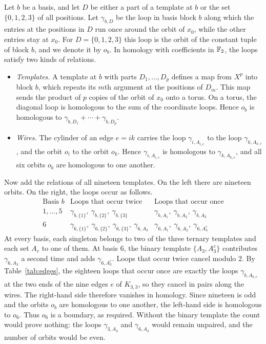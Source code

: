 Let $b$ be a basis, and let $D$ be either a part of a template at $b$ or the set $\{0,1,2,3\}$ of all positions. Let $\gamma_{b,D}$ be the loop in basis block $b$ along which the entries at the positions in $D$ run once around the orbit of $x_0$, while the other entries stay at $x_0$. For $D=\{0,1,2,3\}$ this loop is the orbit of the constant tuple of block $b$, and we denote it by $o_b$. In homology with coefficients in $\mathbb F_2$, the loops satisfy two kinds of relations.
\begin{itemize}
\item \emph{Templates.} A template at $b$ with parts $D_1,\ldots,D_p$ defines a map from $X^p$ into block $b$, which repeats its $m$th argument at the positions of $D_m$. This map sends the product of $p$ copies of the orbit of $x_0$ onto a torus. On a torus, the diagonal loop is homologous to the sum of the coordinate loops. Hence $o_b$ is homologous to $\gamma_{b,D_1}+\cdots+\gamma_{b,D_p}$.
\item \emph{Wires.} The cylinder of an edge $e=ik$ carries the loop $\gamma_{i,A_{i,e}}$ to the loop $\gamma_{k,A_{k,e}}$, and the orbit $o_i$ to the orbit $o_k$. Hence $\gamma_{i,A_{i,e}}$ is homologous to $\gamma_{k,A_{k,e}}$, and all six orbits $o_b$ are homologous to one another.
\end{itemize}
Now add the relations of all nineteen templates. On the left there are nineteen orbits. On the right, the loops occur as follows.
\[
\begin{array}{c|c|c}
\text{Basis }b & \text{Loops that occur twice} & \text{Loops that occur once}\\ \hline
1,\ldots,5 & \gamma_{b,\{1\}},\ \gamma_{b,\{2\}},\ \gamma_{b,\{3\}} & \gamma_{b,A_1},\ \gamma_{b,A_2},\ \gamma_{b,A_3}\\
6 & \gamma_{6,\{1\}},\ \gamma_{6,\{2\}},\ \gamma_{6,\{3\}},\ \gamma_{6,A_3} & \gamma_{6,A_1},\ \gamma_{6,A_2},\ \gamma_{6,A_3^c}
\end{array}
\]
At every basis, each singleton belongs to two of the three ternary templates and each set $A_r$ to one of them. At basis $6$, the binary template $\{A_3,A_3^c\}$ contributes $\gamma_{6,A_3}$ a second time and adds $\gamma_{6,A_3^c}$. Loops that occur twice cancel modulo $2$. By Table~\ref{tab:edges}, the eighteen loops that occur once are exactly the loops $\gamma_{b,A_{b,e}}$ at the two ends of the nine edges $e$ of $K_{3,3}$, so they cancel in pairs along the wires. The right-hand side therefore vanishes in homology. Since nineteen is odd and the orbits $o_b$ are homologous to one another, the left-hand side is homologous to $o_6$. Thus $o_6$ is a boundary, as required. Without the binary template the count would prove nothing: the loops $\gamma_{3,A_3}$ and $\gamma_{6,A_3}$ would remain unpaired, and the number of orbits would be even.

